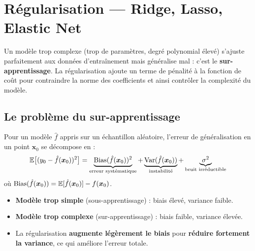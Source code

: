 \chapter{R\'egularisation --- Ridge, Lasso, Elastic Net}
\label{ch:regularisation}

\begin{intuition}[title=\textbf{Pourquoi r\'egulariser ?}]
Un mod\`ele trop complexe (trop de param\`etres, degr\'e polynomial \'elev\'e)
s'ajuste parfaitement aux donn\'ees d'entra\^inement mais g\'en\'eralise mal :
c'est le \textbf{sur-apprentissage}. La r\'egularisation ajoute un terme de
p\'enalit\'e \`a la fonction de co\^ut pour contraindre la norme des coefficients
et ainsi contr\^oler la complexit\'e du mod\`ele.
\end{intuition}

\section{Le probl\`eme du sur-apprentissage}
\label{sec:overfitting}

\begin{definition}
Pour un mod\`ele $\hat{f}$ appris sur un \'echantillon al\'eatoire, l'erreur de
g\'en\'eralisation en un point $\bm{x}_0$ se d\'ecompose en :
\[
  \mathbb{E}\bigl[(y_0 - \hat{f}(\bm{x}_0))^2\bigr]
  = \underbrace{\mathrm{Bias}(\hat{f}(\bm{x}_0))^2}_{\text{erreur syst\'ematique}}
  + \underbrace{\mathrm{Var}(\hat{f}(\bm{x}_0))}_{\text{instabilit\'e}}
  + \underbrace{\sigma^2}_{\text{bruit irr\'eductible}}
\]
o\`u $\mathrm{Bias}(\hat{f}(\bm{x}_0)) = \mathbb{E}[\hat{f}(\bm{x}_0)] - f(\bm{x}_0)$.
\end{definition}

\begin{attention}[title=\textbf{Compromis biais-variance}]
\begin{itemize}
  \item \textbf{Mod\`ele trop simple} (sous-apprentissage) : biais \'elev\'e, variance faible.
  \item \textbf{Mod\`ele trop complexe} (sur-apprentissage) : biais faible, variance \'elev\'ee.
  \item La r\'egularisation \textbf{augmente l\'eg\`erement le biais} pour
        \textbf{r\'eduire fortement la variance}, ce qui am\'eliore l'erreur totale.
\end{itemize}
\end{attention}

